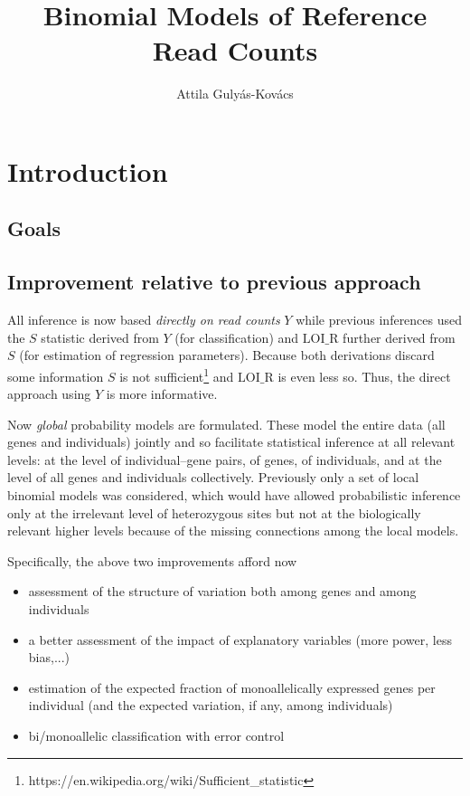 \documentclass[letterpaper]{article}
\title{Binomial Models of Reference Read Counts}
\author{Attila Gulyás-Kovács}
\begin{document}
\maketitle

\section{Introduction}

\subsection{Goals}

\subsection{Improvement relative to previous approach}

All inference is now based \emph{directly on read counts} \(Y\) while previous
inferences used the \(S\) statistic derived from \(Y\) (for classification) and
\(\mathrm{LOI\_R}\) further derived from \(S\) (for estimation of regression parameters).
Because both derivations discard some information \(S\) is
not sufficient\footnote{https://en.wikipedia.org/wiki/Sufficient\_statistic}
and \(\mathrm{LOI\_R}\) is even less so.  Thus, the direct approach using \(Y\) is
more informative.

Now \emph{global} probability models are formulated. These model the
entire data (all genes and individuals) jointly and so facilitate statistical
inference at all relevant levels: at the level of individual--gene pairs, of 
genes, of individuals, and at the level of all genes and individuals collectively.
Previously only a set of local binomial models 
was considered, which would have allowed probabilistic inference only at the irrelevant level of
heterozygous sites but not at the biologically relevant higher levels because of the
missing connections among the local models.

Specifically, the above two improvements afford now
\begin{itemize}
\item assessment of the structure of variation both among genes and among individuals
\item a better assessment of the impact of explanatory variables (more power,
less bias,...)
\item estimation of the expected fraction of monoallelically expressed genes
per individual (and the expected variation, if any, among individuals)
\item bi/monoallelic classification with error control
\end{itemize}
\end{document}
